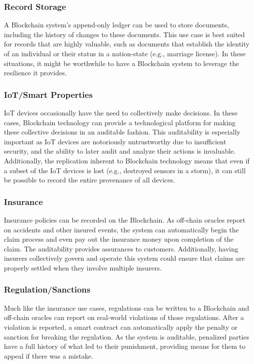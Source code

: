 \subsubsection{Record Storage}
A Blockchain system's append-only ledger can be used to store documents, including the history of changes to these documents.
This use case is best suited for records that are highly valuable, such as documents that establish the identity of an individual or their status in a nation-state (e.g., marriage license).
In these situations, it might be worthwhile to have a Blockchain system to leverage the resilience it provides.

\subsubsection{IoT/Smart Properties}
IoT devices occasionally have the need to collectively make decisions.
In these cases, Blockchain technology can provide a technological platform for making these collective decisions in an auditable fashion.
This auditability is especially important as IoT devices are notoriously untrustworthy due to insufficient security, and the ability to later audit and analyze their actions is invaluable.
Additionally, the replication inherent to Blockchain technology means that even if a subset of the IoT devices is lost (e.g., destroyed sensors in a storm), it can still be possible to record the entire provenance of all devices.

\subsubsection{Insurance}
Insurance policies can be recorded on the Blockchain.
As off-chain oracles report on accidents and other insured events, the system can automatically begin the claim process and even pay out the insurance money upon completion of the claim.
The auditability provides assurances to customers.
Additionally, having insurers collectively govern and operate this system could ensure that claims are properly settled when they involve multiple insurers.

\subsubsection{Regulation/Sanctions}
Much like the insurance use cases, regulations can be written to a Blockchain and off-chain oracles can report on real-world violations of those regulations.
After a violation is reported, a smart contract can automatically apply the penalty or sanction for breaking the regulation.
As the system is auditable, penalized parties have a full history of what led to their punishment, providing means for them to appeal if there was a mistake.

